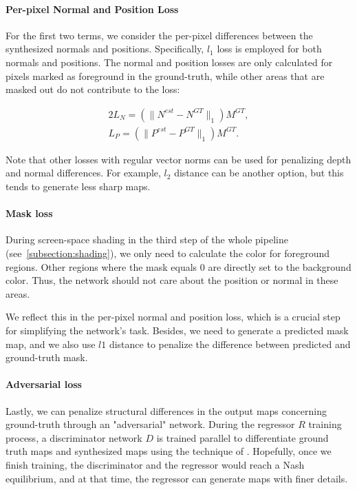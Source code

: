 \documentclass[journal]{vgtc}                %
\begin{document}
\paragraph{Per-pixel Normal and Position Loss}

For the first two terms, we consider the per-pixel differences between the synthesized normals and positions. Specifically, $l_1$ loss is employed for both normals and positions. The normal and position losses are only  calculated for pixels marked as foreground in the ground-truth, while other areas that are masked out do not contribute to the loss: 

\begin{alignat}{2}
L_{N} = (\|N^{est} - N^{GT}\|_1) M^{GT}, \\ 
L_{P} = (\|P^{est} - P^{GT}\|_1) M^{GT}.
\end{alignat}

Note that other losses with regular vector norms can be used for penalizing depth and normal differences. For example, $l_2$ distance can be another option, but this tends to generate less sharp maps. 

\paragraph{Mask loss}
During screen-space shading in the third step of the whole pipeline (see~\ref{subsection:shading}), we only need to calculate the color for foreground regions. Other regions where the mask equals 0 are directly set to the background color. Thus, the network should not care about the position or normal in these areas. 

We reflect this in the per-pixel normal and position loss, which is a crucial step for simplifying the network's task. Besides, we need to generate a predicted mask map, and we also use $l1$ distance to penalize the difference between predicted and ground-truth mask. 

\paragraph{Adversarial loss}
Lastly, we can penalize structural differences in the output maps concerning ground-truth through an "adversarial" network. During the regressor $R$ training process, a discriminator network $D$ is trained parallel to differentiate ground truth maps and synthesized maps using the technique of \cite{goodfellow2014generative}. Hopefully, once we finish training, the discriminator and the regressor would reach a Nash equilibrium, and at that time, the regressor can generate maps with finer details. 
\end{document}
